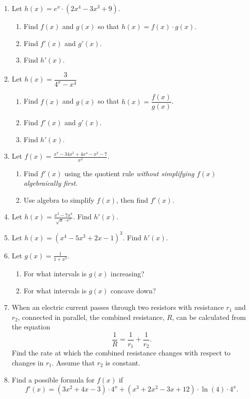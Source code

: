 \documentclass[11pt]{article}
\newcommand{\ds}{\displaystyle}
\begin{document}
\drawtitle
\begin{enumerate}
\item Let $h(x)=e^{x}\cdot (2x^4-3x^3+9)$.
  \begin{enumerate}
  \item Find $f(x)$ and $g(x)$ so that $h(x)=f(x)\cdot g(x)$.
    \vfill
  \item Find $f'(x)$ and $g'(x)$.
    \vfill
  \item Find $h'(x)$.
    \vfill
  \end{enumerate}

\item Let $h(x)=\dfrac{3}{4^x-x^4}$
  \begin{enumerate}
  \item Find $f(x)$ and $g(x)$ so that $h(x)=\dfrac{f(x)}{g(x)}$.
    \vfill
  \item Find $f'(x)$ and $g'(x)$.
    \vfill
  \item Find $h'(x)$.
    \vfill
  \end{enumerate}
  
\newpage

\item Let $\ds f(x) = \frac{x^7-34x^5+4x^4-x^2-7}{x^2}$.
  \begin{enumerate}
  \item Find $f'(x)$ using the quotient rule \textit{without
      simplifying $f(x)$ algebraically first}.  \vfill
  \item Use algebra to simplify $f(x)$, then find $f'(x)$.
    \vfill
  \end{enumerate}

\newpage

\item Let $h(x)=\ds\frac{x^2-7x^4}{\sqrt{x}\cdot e^{x}}$.  Find $h'(x)$.

\newpage

\item Let $h(x)=(x^4-5x^3+2x-1)^3$.  Find $h'(x)$.

\newpage
\item Let $g(x)=\ds\frac{1}{1+x^2}$.
  \begin{enumerate}
  \item For what intervals is $g(x)$ increasing?
    \vfill
  \item For what intervals is $g(x)$ concave down?
    \vfill
  \end{enumerate}
  

\newpage
\item When an electric current passes through two resistors with
  resistance $r_1$ and $r_2$, connected in parallel, the combined
  resistance, $R$, can be calculated from the equation
  \[
  \frac{1}{R} = \frac{1}{r_1} + \frac{1}{r_2}.
  \]
  Find the rate at which the combined resistance changes with respect
  to changes in $r_1$. Assume that $r_2$ is constant.

  \vfill\vfill

\item Find a possible formula for $f(x)$ if
  \[
  f'(x) = (3x^2+4x-3)\cdot 4^x + (x^3+2x^2-3x+12)\cdot\ln(4)\cdot 4^x.
  \]
  \vfill

\end{enumerate}
\end{document}

